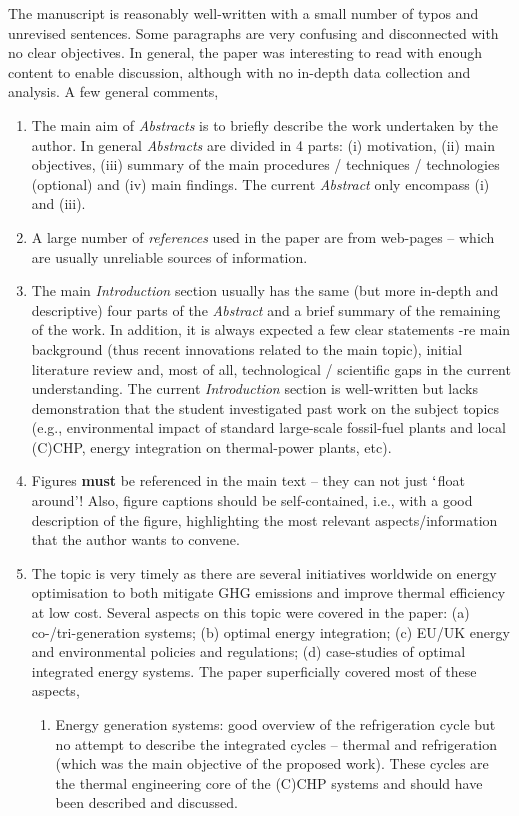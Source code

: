 \documentclass[14pt,twoside]{report}
\begin{document}
The manuscript is reasonably well-written with a small number of typos and unrevised sentences. Some paragraphs are very confusing and disconnected with no clear objectives. In general, the paper was interesting to read with enough content to enable discussion, although with no in-depth data collection and analysis. A few general comments,
\begin{enumerate}
\item The main aim of {\it Abstracts} is to briefly describe the work undertaken by the author. In general {\it Abstracts} are divided in 4 parts: (i) motivation, (ii) main objectives, (iii) summary of the main procedures / techniques / technologies (optional) and (iv) main findings. The current {\it Abstract} only encompass (i) and (iii).
%
\item A large number of {\it references} used in the paper are from web-pages -- which are usually unreliable sources of information.
%
\item The main {\it Introduction} section usually has the same (but more in-depth and descriptive) four parts of the {\it Abstract} and a brief summary of the remaining of the work. In addition, it is always expected a few clear statements -re main background (thus recent innovations related to the main topic), initial literature review and, most of all, technological / scientific gaps in the current understanding. The current {\it Introduction} section is well-written but lacks demonstration that the student investigated past work on the subject topics (e.g., environmental impact of standard large-scale fossil-fuel plants and local (C)CHP, energy integration on thermal-power plants, etc).
%
\item Figures {\bf must} be referenced in the main text -- they can not just $\lq$float around'! Also, figure captions should be self-contained, i.e., with a good description of the figure, highlighting the most relevant aspects/information that the author wants to convene. 
%
\item The topic is very timely as there are several initiatives worldwide on energy optimisation to both mitigate GHG emissions and improve thermal efficiency at low cost. Several aspects on this topic were covered in the paper: (a) co-/tri-generation systems; (b) optimal energy integration; (c) EU/UK energy and environmental policies and regulations; (d) case-studies of optimal integrated energy systems. The paper superficially covered most of these aspects,
\begin{enumerate}
\item Energy generation systems: good overview of the refrigeration cycle but no attempt to describe the integrated cycles -- thermal and refrigeration (which was the main objective of the proposed work). These cycles are the thermal engineering core of the (C)CHP systems and should have been described and discussed. 

\end{enumerate}
\end{enumerate}
\end{document}
